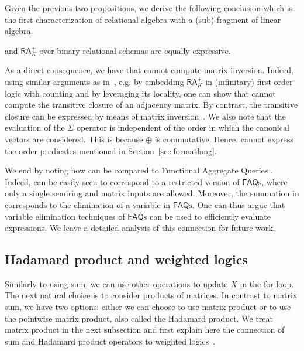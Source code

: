Given the previous two propositions, we derive the following conclusion which is the first characterization of relational algebra with a (sub)-fragment of linear algebra.
\begin{corollary}
	\langsum and $\mathsf{RA}_{K}^+$  over binary relational schemas are equally expressive. 
\end{corollary}

As a direct consequence, we have that \langsum cannot compute matrix inversion. Indeed, using similar arguments as
in~\cite{matlang-journal}, e.g. by embedding $\mathsf{RA}_{K}^+$  in (infinitary) first-order logic with counting and by leveraging its locality, one can show that \langsum cannot compute the transitive closure of an adjacency matrix. By contrast, the transitive closure can be expressed by means of matrix inversion~\cite{matlang-journal}. We also note that the evaluation of the $\Sigma$ operator is
independent of the order in which the canonical vectors are considered. This is because $\oplus$ is commutative.
Hence, \langsum cannot express the order predicates mentioned in Section~\ref{sec:formatlang}.

We end by noting how \langsum can be compared to Functional Aggregate Queries \cite{FAQAI,FAQ}. Indeed, \langsum can be easily seen to correspond to a restricted version of $\mathsf{FAQ}\text{s}$, where only a single semiring and matrix inputs are allowed. Moreover, the summation in \langsum corresponds to the elimination of a variable in $\mathsf{FAQ}\text{s}$. One can thus argue that  variable elimination techniques of $\mathsf{FAQ}\text{s}$ \cite{FAQ} can be used to efficiently evaluate \langsum expressions. We leave a detailed analysis of this connection for future work.




\subsection{Hadamard product and weighted logics}\label{subsec:langprod}
Similarly to using sum, we can use other operations to update $X$ in the for-loop. The next natural choice is to consider products of matrices. In contrast to matrix sum, we have two options: either we can choose to use matrix product or to use the pointwise matrix product, also called the Hadamard product. We treat  matrix product in the next subsection and first explain here the connection of sum and Hadamard product operators to weighted logics~\cite{DrosteG05}.

